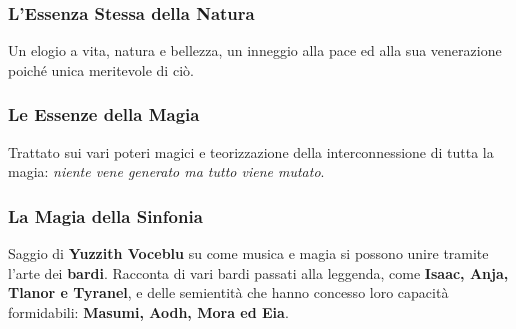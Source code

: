 \documentclass[10pt,twoside,onecolumn,openany]{book}
\begin{document}
\subsubsection{L'Essenza Stessa della Natura} Un elogio a vita, natura e bellezza, un inneggio alla pace ed alla sua venerazione poiché unica meritevole di ciò.
\subsubsection{Le Essenze della Magia} Trattato sui vari poteri magici e teorizzazione della interconnessione di tutta la magia: \textit{niente vene generato ma tutto viene mutato}.
\subsubsection{La Magia della Sinfonia} Saggio di \textbf{Yuzzith Voceblu} su come musica e magia si possono unire tramite l'arte dei \textbf{bardi}. Racconta di vari bardi passati alla leggenda, come \textbf{Isaac, Anja, Tlanor e Tyranel}, e delle semientità che hanno concesso loro capacità formidabili: \textbf{Masumi, Aodh, Mora ed Eia}.
\end{document}
